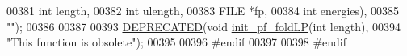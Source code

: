 \begin{DoxyCode}
00381                                      \textcolor{keywordtype}{int}    length,
00382                                      \textcolor{keywordtype}{int}    ulength,
00383                                      FILE   *fp,
00384                                      \textcolor{keywordtype}{int}    energies),
00385 \textcolor{stringliteral}{""});
00386 
00387 
00393 \mbox{\hyperlink{_l_pfold_8h_aab347a3c03fbe8e7319551b9fa0cce4a}{DEPRECATED}}(\textcolor{keywordtype}{void} \mbox{\hyperlink{_l_pfold_8h_ae85bf55053e9fb295208be322e0fa07a}{init\_pf\_foldLP}}(\textcolor{keywordtype}{int} length),
00394 \textcolor{stringliteral}{"This function is obsolete"});
00395 
00396 \textcolor{preprocessor}{#endif}
00397 
00398 \textcolor{preprocessor}{#endif}
\end{DoxyCode}
